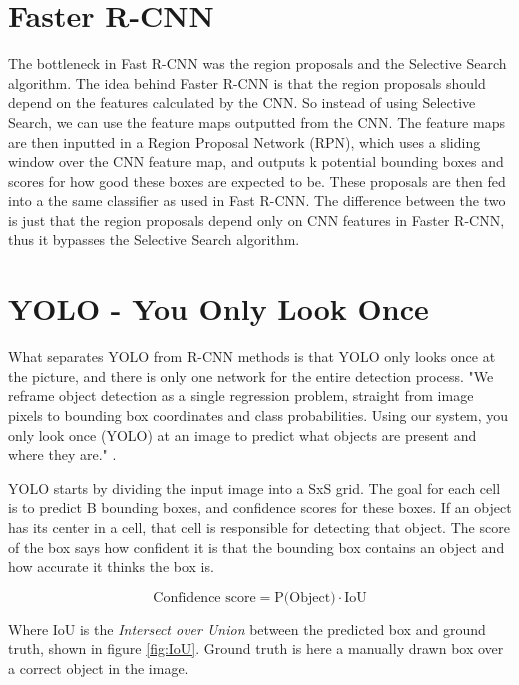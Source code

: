 \section{Faster R-CNN }
The bottleneck in Fast R-CNN was the region proposals and the Selective Search algorithm. The idea behind Faster R-CNN \citep{FasterR-CNN} is that the region proposals should depend on the features calculated by the CNN. So instead of using Selective Search, we can use the feature maps outputted from the CNN. The feature maps are then inputted in a Region Proposal Network (RPN), which uses a sliding window over the CNN feature map, and outputs k potential bounding boxes and scores for how good these boxes are expected to be. These proposals are then fed into a the same classifier as used in Fast R-CNN. The difference between the two is just that the region proposals depend only on CNN features in Faster R-CNN, thus it bypasses the Selective Search algorithm.



\section{YOLO - You Only Look Once }
\label{sec:yolo}
What separates YOLO \citep{YOLOv1} \citep{YOLOv2} \citep{YOLOv3} from R-CNN methods is that YOLO only looks once at the picture, and there is only one network for the entire detection process. "We reframe object detection as a single regression problem, straight from image pixels to bounding box coordinates and class probabilities. Using our system, you only look once (YOLO) at an image to predict what objects are present and where they are." \citep{YOLOv1}. 
\vspace{0.5cm}

YOLO starts by dividing the input image into a SxS grid. The goal for each cell is to predict B bounding boxes, and confidence scores for these boxes. If an object has its center in a cell, that cell is responsible for detecting that object. The score of the box says how confident it is that the bounding box contains an object and how accurate it thinks the box is. 

\begin{equation}
    \text{Confidence score} = \text{P(Object)} \cdot \text{IoU}
\end{equation}

Where IoU is the \textit{Intersect over Union} between the predicted box and ground truth, shown in figure \ref{fig:IoU}. Ground truth is here a manually drawn box over a correct object in the image.


